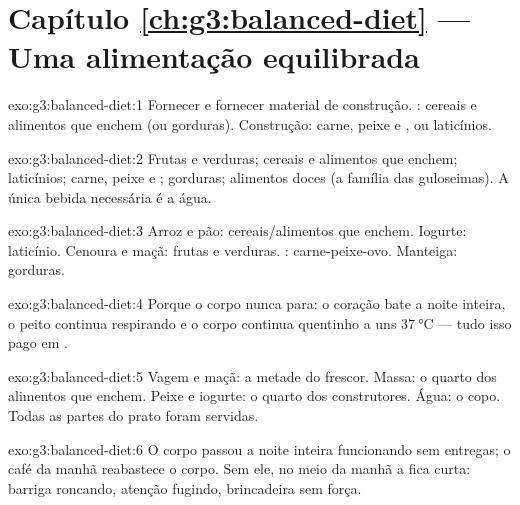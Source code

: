 \section*{Capítulo \ref{ch:g3:balanced-diet} --- Uma alimentação equilibrada}

\begin{solution}{exo:g3:balanced-diet:1}
Fornecer  e fornecer material de construção. : cereais
e alimentos que enchem (ou gorduras). Construção: carne, peixe e
, ou laticínios.
\end{solution}

\begin{solution}{exo:g3:balanced-diet:2}
Frutas e verduras; cereais e alimentos que enchem; laticínios;
carne, peixe e ; gorduras; alimentos doces (a família das
guloseimas). A única bebida necessária é a água.
\end{solution}

\begin{solution}{exo:g3:balanced-diet:3}
Arroz e pão: cereais/alimentos que enchem. Iogurte: laticínio.
Cenoura e maçã: frutas e verduras. : carne-peixe-ovo. Manteiga:
gorduras.
\end{solution}

\begin{solution}{exo:g3:balanced-diet:4}
Porque o corpo nunca para: o coração bate a noite inteira, o peito
continua respirando e o corpo continua quentinho a uns
$\qty{37}{\degreeCelsius}$ --- tudo isso pago em .
\end{solution}

\begin{solution}{exo:g3:balanced-diet:5}
Vagem e maçã: a metade do frescor. Massa: o quarto dos alimentos que
enchem. Peixe e iogurte: o quarto dos construtores. Água: o copo.
Todas as partes do prato foram servidas.
\end{solution}

\begin{solution}{exo:g3:balanced-diet:6}
O corpo passou a noite inteira funcionando sem entregas; o café da
manhã reabastece o corpo. Sem ele, no meio da manhã a  fica
curta: barriga roncando, atenção fugindo, brincadeira sem força.
\end{solution}

